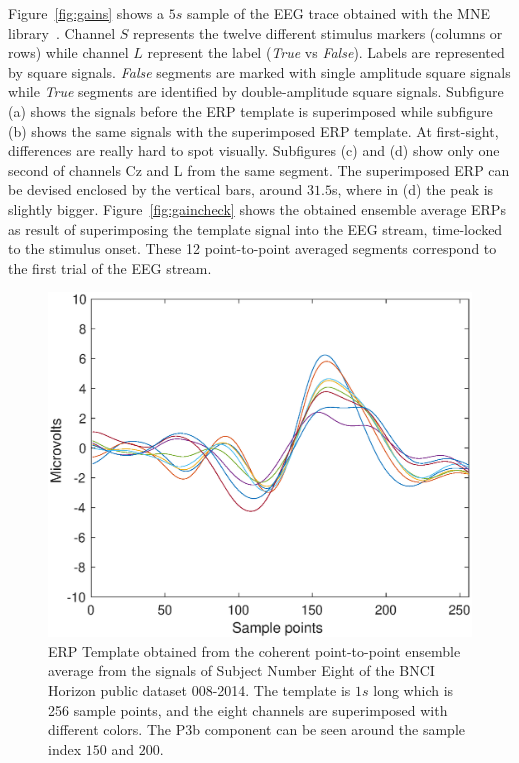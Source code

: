 \documentclass[brainsci,article,submit,moreauthors,pdftex,10pt,a4paper]{mdpi}
\begin{document}

Figure~\ref{fig:gains} shows a $5s$ sample of the EEG trace obtained with the MNE library~\citep{Gramfort2013}.  Channel $S$ represents the twelve different stimulus markers (columns or rows) while channel $L$ represent the label (\textit{True} vs \textit{False}).  Labels are represented by square signals.  \textit{False} segments are marked with single amplitude square signals while \textit{True} segments are identified by double-amplitude square signals.  Subfigure (a) shows the signals before the ERP template is superimposed while subfigure (b) shows the same signals with the superimposed ERP template.  At first-sight, differences are really hard to spot visually.  Subfigures (c) and (d) show only one second of channels Cz and L from the same segment.  The superimposed ERP can be devised enclosed by the vertical bars, around $31.5$s, where in (d) the peak is slightly bigger.  Figure~\ref{fig:gaincheck} shows the obtained ensemble average ERPs as result of superimposing the template signal into the EEG stream, time-locked to the stimulus onset.   These 12 point-to-point averaged segments correspond to the first trial of the EEG stream.


\begin{figure}[H]
\centering
\includegraphics[width=12cm]{images/erptemplate1.eps}
\caption{ERP Template obtained from the coherent point-to-point ensemble average from the signals of Subject Number Eight of the BNCI Horizon public dataset 008-2014. The template is $1s$ long which is 256 sample points, and the eight channels are superimposed with different colors.  The P3b component can be seen around the sample index $150$ and $200$.}
\label{fig:erptemplate1}
\end{figure}
\end{document}
